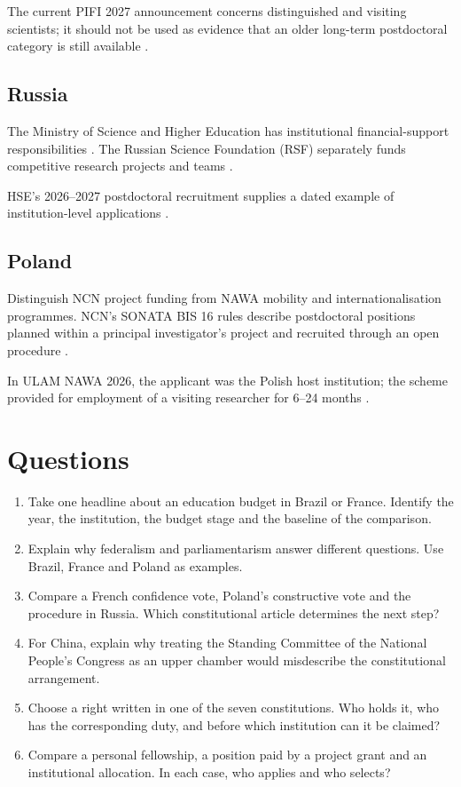 The current PIFI 2027 announcement concerns
distinguished
and visiting scientists; it should not be
used as
evidence that an older long-term postdoctoral
category
is still available \cite{gsf-pifi-2027}.

\subsection{Russia}
\label{subsection-gsf-funding-russia}

The Ministry of Science and Higher Education
has
institutional financial-support
responsibilities
\cite{gsf-ru-ministry}.
The Russian Science Foundation (RSF)
separately funds
competitive research projects and teams
\cite{gsf-rsf}.

HSE's 2026--2027 postdoctoral recruitment
supplies
a dated example of institution-level
applications
\cite{gsf-hse-postdoc}.

\subsection{Poland}
\label{subsection-gsf-funding-poland}

Distinguish NCN project funding from NAWA
mobility
and internationalisation programmes.
NCN's SONATA BIS 16 rules describe
postdoctoral
positions planned within a principal
investigator's
project and recruited through an open
procedure
\cite{gsf-ncn-sonata16}.

In ULAM NAWA 2026, the applicant was the
Polish
host institution; the scheme provided for
employment
of a visiting researcher for 6--24 months
\cite{gsf-ulam-2026}.

\section{Questions}
\label{section-gsf-study}

\begin{enumerate}
\item Take one headline about an education
budget in Brazil or France. Identify the
year, the institution, the budget stage and
the baseline of the comparison.
\item Explain why federalism and
parliamentarism answer different questions.
Use Brazil, France and Poland as examples.
\item Compare a French confidence vote,
Poland's constructive vote and the procedure
in Russia. Which constitutional article
determines the next step?
\item For China, explain why treating the
Standing Committee of the National People's
Congress as an upper chamber would
misdescribe the constitutional arrangement.
\item Choose a right written in one of the
seven constitutions. Who holds it, who has
the corresponding duty, and before which
institution can it be claimed?
\item Compare a personal fellowship, a
position paid by a project grant and an
institutional allocation. In each case, who
applies and who selects?
\end{enumerate}





